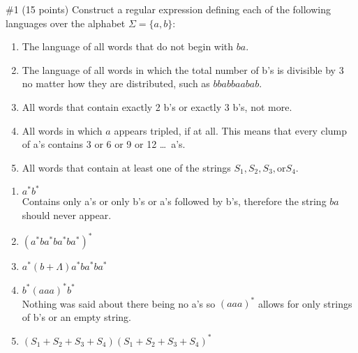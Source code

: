 \begin{problem}{\#1 (15 points)}
    Construct a regular expression defining each of the following languages over the alphabet \(\Sigma=\{a,b\}\):
    \begin{enumerate}[label=\alph*)]
        \item The language of all words that do not begin with \(ba\).
        \item The  language  of  all  words  in  which  the  total number of b’s is divisible by 3 no matter how they are distributed, such as \(bbabbaabab\).
        \item All words that contain exactly 2 b’s or exactly 3 b’s, not more.
        \item All words in which \(a\) appears tripled, if at all. This means that  every  clump of a’s contains 3 or 6 or 9 or 12 \ldots\ a’s.
        \item All words that contain at least one of the strings \(S_1,S_2,S_3, \text{or} S_4\).
    \end{enumerate}
\end{problem}
\vspace{2em}
\begin{solution}
    \begin{enumerate}[label=\alph*)]
        \item \(a^*b^*\)\\Contains only a's or only b's or a's followed by b's, therefore the string \(ba\) should never appear.
        \item \((a^*ba^*ba^*ba^*)^*\)
        \item \(a^*(b+\Lambda)a^*ba^*ba^*\)
        \item \(b^*(aaa)^*b^*\)\\Nothing was said about there being no a's so \((aaa)^*\) allows for only strings of b's or an empty string.
        \item \((S_1+S_2+S_3+S_4)(S_1+S_2+S_3+S_4)^*\)
    \end{enumerate}
\end{solution}


